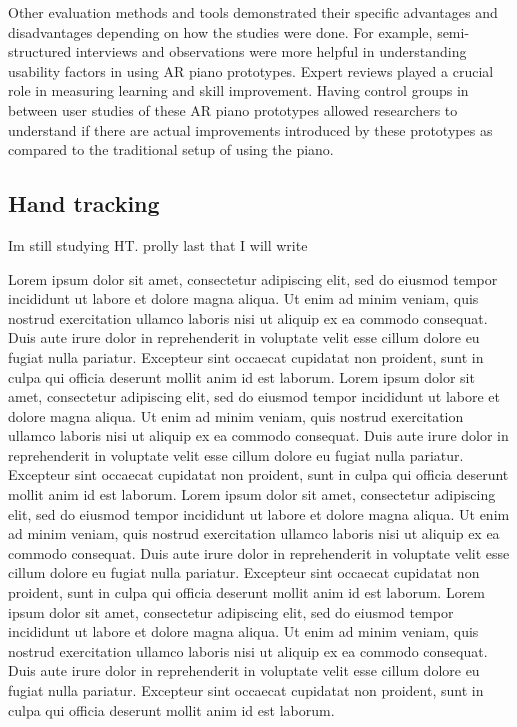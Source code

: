 \documentclass[manuscript,screen]{acmart}
\begin{document}
Other evaluation methods and tools demonstrated their specific advantages and disadvantages depending on how the studies were done. For example, semi-structured interviews and observations were more helpful in understanding usability factors in using AR piano prototypes. Expert reviews played a crucial role in measuring learning and skill improvement. Having control groups in between user studies of these AR piano prototypes allowed researchers to understand if there are actual improvements introduced by these prototypes as compared to the traditional setup of using the piano. 


\subsection{Hand tracking}
\label{subsec: ht}
Im still studying HT. prolly last that I will write

Lorem ipsum dolor sit amet, consectetur adipiscing elit, sed do eiusmod tempor incididunt ut labore et dolore magna aliqua. Ut enim ad minim veniam, quis nostrud exercitation ullamco laboris nisi ut aliquip ex ea commodo consequat. Duis aute irure dolor in reprehenderit in voluptate velit esse cillum dolore eu fugiat nulla pariatur. Excepteur sint occaecat cupidatat non proident, sunt in culpa qui officia deserunt mollit anim id est laborum. Lorem ipsum dolor sit amet, consectetur adipiscing elit, sed do eiusmod tempor incididunt ut labore et dolore magna aliqua. Ut enim ad minim veniam, quis nostrud exercitation ullamco laboris nisi ut aliquip ex ea commodo consequat. Duis aute irure dolor in reprehenderit in voluptate velit esse cillum dolore eu fugiat nulla pariatur. Excepteur sint occaecat cupidatat non proident, sunt in culpa qui officia deserunt mollit anim id est laborum. Lorem ipsum dolor sit amet, consectetur adipiscing elit, sed do eiusmod tempor incididunt ut labore et dolore magna aliqua. Ut enim ad minim veniam, quis nostrud exercitation ullamco laboris nisi ut aliquip ex ea commodo consequat. Duis aute irure dolor in reprehenderit in voluptate velit esse cillum dolore eu fugiat nulla pariatur. Excepteur sint occaecat cupidatat non proident, sunt in culpa qui officia deserunt mollit anim id est laborum. Lorem ipsum dolor sit amet, consectetur adipiscing elit, sed do eiusmod tempor incididunt ut labore et dolore magna aliqua. Ut enim ad minim veniam, quis nostrud exercitation ullamco laboris nisi ut aliquip ex ea commodo consequat. Duis aute irure dolor in reprehenderit in voluptate velit esse cillum dolore eu fugiat nulla pariatur. Excepteur sint occaecat cupidatat non proident, sunt in culpa qui officia deserunt mollit anim id est laborum.
\end{document}
